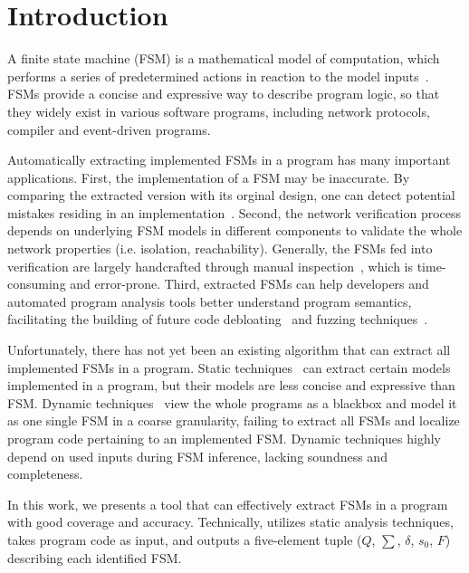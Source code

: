 \section{Introduction}

A finite state machine (FSM) is a mathematical model of computation, 
which performs a series of predetermined actions in 
reaction to the model inputs~\cite{fsm}. 
FSMs provide a concise and expressive way to describe
program logic, so that they widely exist in various software programs, 
including network protocols, 
compiler and event-driven programs. 

Automatically extracting implemented FSMs in a program has 
many important applications. 
First, the implementation of a FSM may be inaccurate. By 
 comparing the extracted version with its orginal design, one 
can detect potential mistakes residing in an implementation~\cite{protocol-bug}. 
Second, the network verification process depends on underlying FSM models 
in different components to validate the whole network properties 
(i.e. isolation, reachability).
Generally, the FSMs fed into verification are largely handcrafted through 
manual inspection~\cite{fayaz2016buzz,SymNet}, which is time-consuming and error-prone. 
Third, extracted FSMs can help developers and automated program analysis tools
better understand program semantics, facilitating the building of future 
code debloating~\cite{container-debloating-1,container-debloating-2,dinghao-1} 
and fuzzing techniques~\cite{afl,Angora,youwei-1}.


Unfortunately, there has not yet been an existing algorithm that can extract 
all implemented FSMs in a program.
Static techniques~\cite{wu2016automatic,khalid2016paving} 
can extract certain models implemented in a program,
but their models are less concise and expressive than FSM. 
Dynamic techniques~\cite{angluin1987learning,moon2019alembic,cho2011mace} 
view the whole programs as a blackbox and 
model it as one single FSM in a coarse granularity, 
failing to extract all FSMs and localize program code 
pertaining to an implemented FSM. 
Dynamic techniques highly depend on used inputs during FSM inference, 
lacking soundness and completeness.  

In this work, we presents a tool \Tool{} that can effectively extract FSMs in a program
with good coverage and accuracy. Technically,  
\Tool{} utilizes static analysis techniques, takes program code as input, 
and outputs a five-element tuple ($Q$, $\sum$, $\delta$, $s_0$, $F$) 
describing each identified FSM. 


